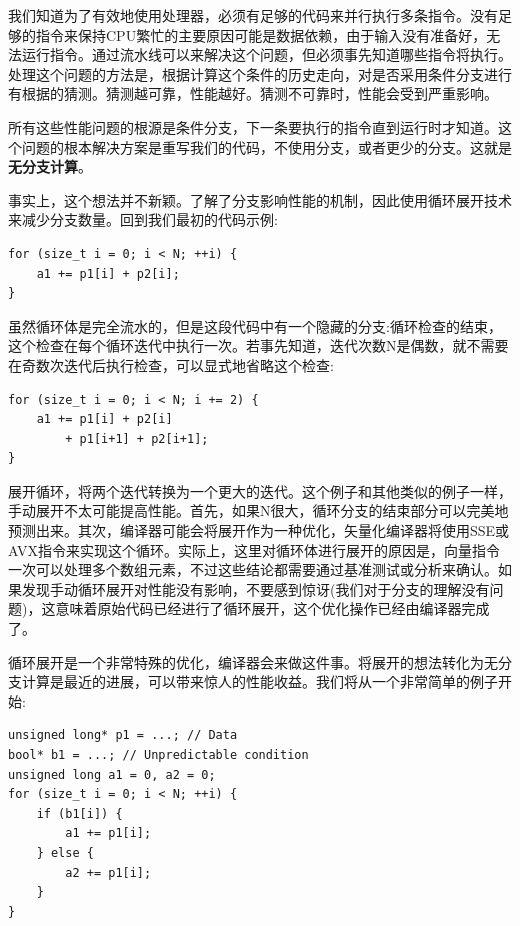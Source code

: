 
我们知道为了有效地使用处理器，必须有足够的代码来并行执行多条指令。没有足够的指令来保持CPU繁忙的主要原因可能是数据依赖，由于输入没有准备好，无法运行指令。通过流水线可以来解决这个问题，但必须事先知道哪些指令将执行。处理这个问题的方法是，根据计算这个条件的历史走向，对是否采用条件分支进行有根据的猜测。猜测越可靠，性能越好。猜测不可靠时，性能会受到严重影响。

所有这些性能问题的根源是条件分支，下一条要执行的指令直到运行时才知道。这个问题的根本解决方案是重写我们的代码，不使用分支，或者更少的分支。这就是\textbf{无分支计算}。


事实上，这个想法并不新颖。了解了分支影响性能的机制，因此使用循环展开技术来减少分支数量。回到我们最初的代码示例:

\begin{lstlisting}[style=styleCXX]
for (size_t i = 0; i < N; ++i) {
	a1 += p1[i] + p2[i];
}
\end{lstlisting}

虽然循环体是完全流水的，但是这段代码中有一个隐藏的分支:循环检查的结束，这个检查在每个循环迭代中执行一次。若事先知道，迭代次数N是偶数，就不需要在奇数次迭代后执行检查，可以显式地省略这个检查:

\begin{lstlisting}[style=styleCXX]
for (size_t i = 0; i < N; i += 2) {
	a1 += p1[i] + p2[i]
		+ p1[i+1] + p2[i+1];
}
\end{lstlisting}

展开循环，将两个迭代转换为一个更大的迭代。这个例子和其他类似的例子一样，手动展开不太可能提高性能。首先，如果N很大，循环分支的结束部分可以完美地预测出来。其次，编译器可能会将展开作为一种优化，矢量化编译器将使用SSE或AVX指令来实现这个循环。实际上，这里对循环体进行展开的原因是，向量指令一次可以处理多个数组元素，不过这些结论都需要通过基准测试或分析来确认。如果发现手动循环展开对性能没有影响，不要感到惊讶(我们对于分支的理解没有问题)，这意味着原始代码已经进行了循环展开，这个优化操作已经由编译器完成了。


循环展开是一个非常特殊的优化，编译器会来做这件事。将展开的想法转化为无分支计算是最近的进展，可以带来惊人的性能收益。我们将从一个非常简单的例子开始:

\begin{lstlisting}[style=styleCXX]
unsigned long* p1 = ...; // Data
bool* b1 = ...; // Unpredictable condition
unsigned long a1 = 0, a2 = 0;
for (size_t i = 0; i < N; ++i) {
	if (b1[i]) {
		a1 += p1[i];
	} else {
		a2 += p1[i];
	}
}
\end{lstlisting}

